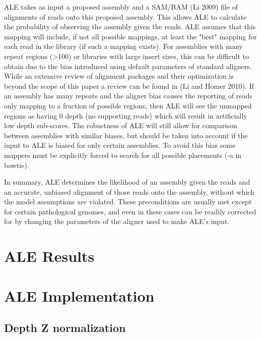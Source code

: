 \documentclass[phd,tocprelim]{cornell}
\begin{document}
ALE takes as input a proposed assembly and a SAM/BAM (Li 2009) file of alignments of reads onto this proposed assembly. This allows ALE to calculate the probability of observing the assembly given the reads. ALE assumes that this mapping will include, if not all possible mappings, at least the "best" mapping for each read in the library (if such a mapping exists). For assemblies with many repeat regions (>100) or libraries with large insert sizes, this can be difficult to obtain due to the bias introduced using default parameters of standard aligners. While an extensive review of alignment packages and their optimization is beyond the scope of this paper a review can be found in (Li and Homer 2010). If an assembly has many repeats and the aligner bias causes the reporting of reads only mapping to a fraction of possible regions, then ALE will see the unmapped regions as having 0 depth (no supporting reads) which will result in artificially low depth sub-scores. The robustness of ALE will still allow for comparison between assemblies with similar biases, but should be taken into account if the input to ALE is biased for only certain assemblies. To avoid this bias some mappers must be explicitly forced to search for all possible placements (-a in bowtie).

In summary, ALE determines the likelihood of an assembly given the reads and an accurate, unbiased alignment of those reads onto the assembly, without which the model assumptions are violated. These preconditions are usually met except for certain pathological genomes, and even in these cases can be readily corrected for by changing the parameters of the aligner used to make ALE’s input.



\chapter{ALE Results} %
\label{cha:ALE Results}


\chapter{ALE Implementation} %
\label{cha:ALE Implementation}

\section{Depth Z normalization} %
\label{sec:Depth Z normalization}
\end{document}
